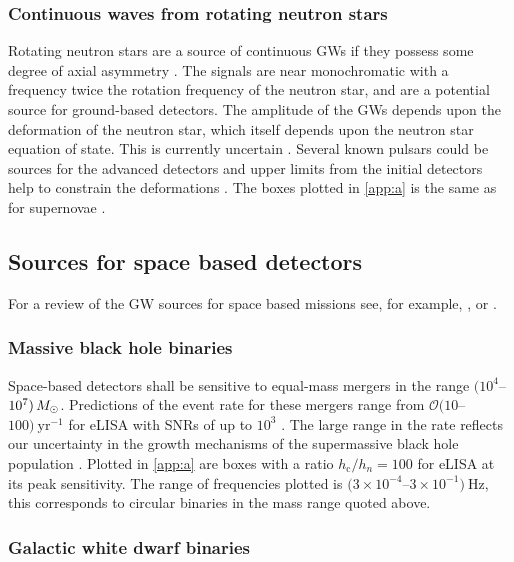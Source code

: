 \subsubsection{Continuous waves from rotating neutron stars}

Rotating neutron stars are a source of continuous GWs if they possess some degree of axial asymmetry \citep{Abbott2007, Prix2009, Einstein@Home}. The signals are near monochromatic with a frequency twice the rotation frequency of the neutron star, and are a potential source for ground-based detectors. The amplitude of the GWs depends upon the deformation of the neutron star, which itself depends upon the neutron star equation of state. This is currently uncertain \citep{Lattimer2012}. Several known pulsars could be sources for the advanced detectors and upper limits from the initial detectors help to constrain the deformations \citep{Aasi2014a}. The boxes plotted in \ref{app:a} is the same as for supernovae .

\subsection{Sources for space based detectors}

For a review of the GW sources for space based missions see, for example, \citet{Amaro-Seoane-et-al}, \citet{Gairetal} or \citet{eLISAyellowbook}.


\subsubsection{Massive black hole binaries}

Space-based detectors shall be sensitive to equal-mass mergers in the range $(10^{4}$--$10^{7})\,M_{ \odot }$. Predictions of the event rate for these mergers range from ${\mathcal{O}}(10$--$100)~\mathrm{yr}^{-1}$ for eLISA with SNRs of up to $10^3$ \citep{TheGravitationalUniverse}. The large range in the rate reflects our uncertainty in the growth mechanisms of the supermassive black hole population \citep{Volonteri2010}. Plotted in \ref{app:a} are boxes with a ratio $h_\mathrm{c}/h_{n}=100$ for eLISA at its peak sensitivity. The range of frequencies plotted is $(3\times 10^{-4}$--$3\times 10^{-1})~\mathrm{Hz}$, this corresponds to circular binaries in the mass range quoted above.

\subsubsection{Galactic white dwarf binaries} \label{sec:GB}

